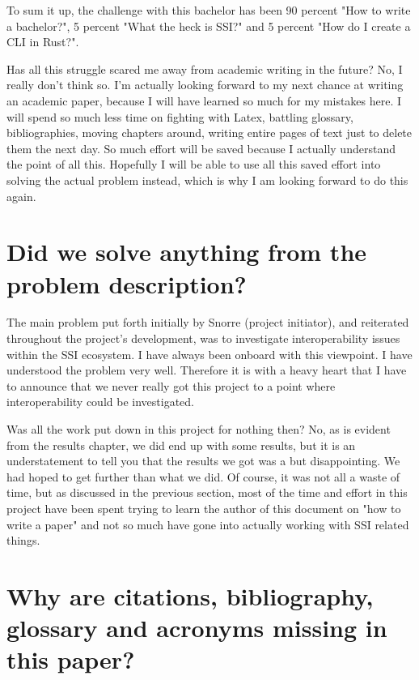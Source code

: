 To sum it up, the challenge with this bachelor has been 90 percent "How to write a bachelor?", 5 percent "What the heck is SSI?" and 5 percent "How do I create a CLI in Rust?".

Has all this struggle scared me away from academic writing in the future? No, I really don't think so. I'm actually looking forward to my next chance at writing an academic paper, because I will have learned so much for my mistakes here. I will spend so much less time on fighting with Latex, battling glossary, bibliographies, moving chapters around, writing entire pages of text just to delete them the next day. So much effort will be saved because I actually understand the point of all this. Hopefully I will be able to use all this saved effort into solving the actual problem instead, which is why I am looking forward to do this again.



\section{Did we solve anything from the problem description?}

The main problem put forth initially by Snorre (project initiator), and reiterated throughout the project's development, was to investigate interoperability issues within the SSI ecosystem. I have always been onboard with this viewpoint. I have understood the problem very well. Therefore it is with a heavy heart that I have to announce that we never really got this project to a point where interoperability could be investigated.

Was all the work put down in this project for nothing then? No, as is evident from the results chapter, we did end up with some results, but it is an understatement to tell you that the results we got was a but disappointing. We had hoped to get further than what we did. Of course, it was not all a waste of time, but as discussed in the previous section, most of the time and effort in this project have been spent trying to learn the author of this document on "how to write a paper" and not so much have gone into actually working with SSI related things.



\section{Why are citations, bibliography, glossary and acronyms missing in this paper?}

